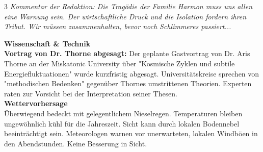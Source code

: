 \documentclass[10pt, a4paper]{article}
\begin{document}
\begin{multicols}{3}
\vspace{0.5em} %
\textit{Kommentar der Redaktion: Die Tragödie der Familie Harmon muss uns allen eine Warnung sein. Der wirtschaftliche Druck und die Isolation fordern ihren Tribut. Wir müssen zusammenhalten, bevor noch Schlimmeres passiert...}

\hrulefill %

\large \textbf{Wissenschaft \& Technik} \normalsize \\
\textbf{Vortrag von Dr. Thorne abgesagt:} Der geplante Gastvortrag von Dr. Aris Thorne an der Miskatonic University über "Kosmische Zyklen und subtile Energiefluktuationen" wurde kurzfristig abgesagt. Universitätskreise sprechen von "methodischen Bedenken" gegenüber Thornes umstrittenen Theorien. Experten raten zur Vorsicht bei der Interpretation seiner Thesen. \\

\vspace{0.8em}
\large \textbf{Wettervorhersage} \normalsize \\
Überwiegend bedeckt mit gelegentlichem Nieselregen. Temperaturen bleiben ungewöhnlich kühl für die Jahreszeit. Sicht kann durch lokalen Bodennebel beeinträchtigt sein. Meteorologen warnen vor unerwarteten, lokalen Windböen in den Abendstunden. Keine Besserung in Sicht. \\

\end{multicols} %
\end{document}

